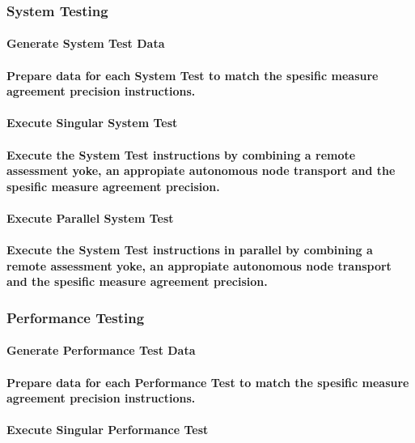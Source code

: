 \documentclass{acm_proc_article-sp}
\begin{document}
\subsubsection{System Testing}
\paragraph{Generate System Test Data}
\paragraph{Prepare data for each System Test to match the spesific measure agreement precision instructions.}
\paragraph{Execute Singular System Test}
\paragraph{Execute the System Test instructions by combining a remote assessment yoke, an appropiate autonomous node transport and the spesific measure agreement precision.}
\paragraph{Execute Parallel System Test}
\paragraph{Execute the System Test instructions in parallel by combining a remote assessment yoke, an appropiate autonomous node transport and the spesific measure agreement precision.}
\subsubsection{Performance Testing}
\paragraph{Generate Performance Test Data}
\paragraph{Prepare data for each Performance Test to match the spesific measure agreement precision instructions.}
\paragraph{Execute Singular Performance Test}
\end{document}
